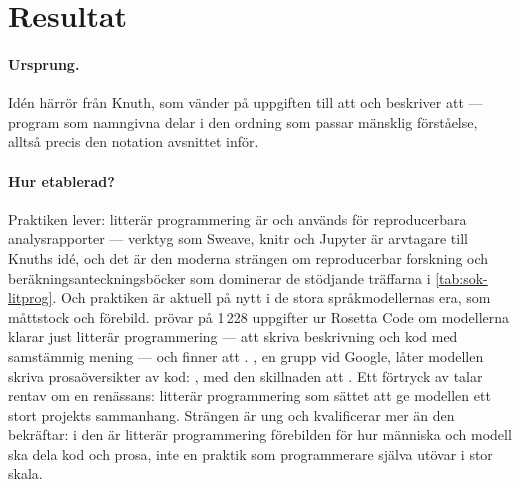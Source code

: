 \section{Resultat}
\label{sec:litprog-resultat}

\paragraph{Ursprung.}  Idén härrör från Knuth, som vänder på uppgiften
till att  och beskriver att  --- program som namngivna
delar i den ordning som passar mänsklig förståelse, alltså precis den
notation avsnittet inför.

\paragraph{Hur etablerad?}  Praktiken lever: litterär programmering är
och används för reproducerbara analysrapporter --- verktyg som Sweave,
knitr och Jupyter är arvtagare till Knuths idé, och det är den moderna
strängen om reproducerbar forskning och beräkningsanteckningsböcker som
dominerar de stödjande träffarna i \cref{tab:sok-litprog}.  Och
praktiken är aktuell på nytt i de stora språkmodellernas era, som
måttstock och förebild.  \textcite{sunStaron2026} prövar på 1\,228
uppgifter ur Rosetta Code om modellerna klarar just litterär
programmering --- att skriva beskrivning och kod med samstämmig
mening --- och finner att .
\textcite{shi2025}, en grupp vid Google, låter modellen skriva
prosaöversikter av kod: , med den skillnaden att
.  Ett förtryck av
\textcite{zhang2025} talar rentav om en renässans: litterär programmering
som sättet att ge modellen ett stort projekts sammanhang.  Strängen är
ung och kvalificerar mer än den bekräftar: i den är litterär
programmering förebilden för hur människa och modell ska dela kod och
prosa, inte en praktik som programmerare själva utövar i stor skala.

